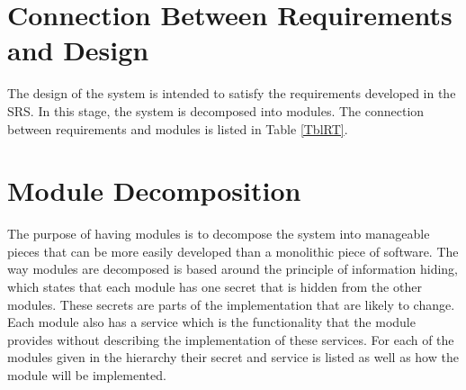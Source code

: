 \documentclass[12pt, titlepage]{article}
\begin{document}
\section{Connection Between Requirements and Design} %

The design of the system is intended to satisfy the requirements developed in
the SRS. In this stage, the system is decomposed into modules. The connection
between requirements and modules is listed in Table \ref{TblRT}.

\section{Module Decomposition} \label{SecMD} %

The purpose of having modules is to decompose the system into manageable pieces that can be more easily developed than a monolithic piece of software. The way modules are decomposed is based around the principle of information hiding, which states that each module has one secret that is hidden from the other modules. These secrets are parts of the implementation that are likely to change. Each module also has a service which is the functionality that the module provides without describing the implementation of these services. For each of the modules given in the hierarchy their secret and service is listed as well as how the module will be implemented.


\end{document}
